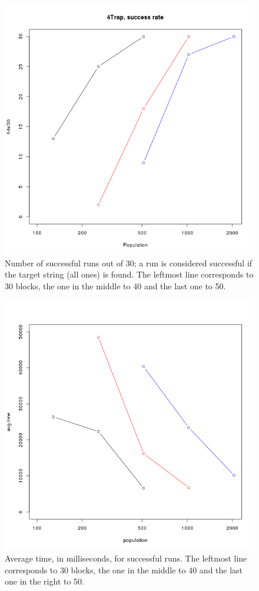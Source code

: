 \documentclass{sig-alternate}
\begin{document}
\begin{figure}[htb]
\centering
   \includegraphics[scale=0.4]{base-hits-pop.png}
\caption{Number of successful runs out of 30; a run is considered
  successful if the target string (all ones) is found. The leftmost
  line corresponds to 30 blocks, the one in the middle to 40 and the
  last one to 50. }
\label{fig:pop}
\end{figure}
%
\begin{figure}[htb]
\centering
   \includegraphics[scale=0.4]{base-time-pop.png}
\caption{Average time, in milliseconds, for successful runs. The leftmost
  line corresponds to 30 blocks, the one in the middle to 40 and the
  last one in the right to 50. }
\label{fig:time}
\end{figure}
\end{document}
